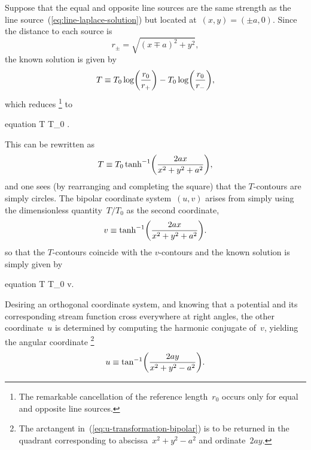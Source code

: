 Suppose that the equal and opposite line sources
are the same strength as the line source~(\ref{eq:line-laplace-solution})
but located at~$(x, y) = (\pm a, 0)$.
Since the distance to each source is
\begin{equation}
  r_\pm = \sqrt{(x \mp a)^2 + y^2},
  \label{eq:bipolar-source-distances}
\end{equation}
the known solution is given by
\begin{equation}
  T \ideq
    T_0 \log \roundbr*{\frac{r_0}{r_+}}
      -
    T_0 \log \roundbr*{\frac{r_0}{r_-}},
  \label{eq:bipolar-laplace-solution-terms}
\end{equation}
which reduces%
\footnote{
  The remarkable cancellation of the reference length~$r_0$
  occurs only for equal and opposite line sources.
}
to
\begin{important}{equation}
  T \ideq T_0 \log {}.
  \label{eq:bipolar-laplace-solution-source-distances}
\end{important}
This can be rewritten as
\begin{equation}
  T \ideq T_0 \tanh^{-1} \roundbr*{\frac{2 a x}{x^2 + y^2 + a^2}},
  \label{eq:bipolar-laplace-solution-inverse-tanh}
\end{equation}
and one sees
(by rearranging and completing the square)
that the $T$-contours are simply circles.
The bipolar coordinate system~$(u, v)$ arises
from simply using the dimensionless quantity~$T / T_0$
as the second coordinate,
\begin{equation}
  v \ideq \tanh^{-1} \roundbr*{\frac{2 a x}{x^2 + y^2 + a^2}}.
  \label{eq:v-transformation-bipolar}
\end{equation}
so that the $T$-contours coincide with the $v$-contours
and the known solution is simply given by
\begin{important}{equation}
  T \ideq T_0 \cdot v.
  \label{eq:bipolar-laplace-solution}
\end{important}
Desiring an orthogonal coordinate system,
and knowing that a potential and its corresponding stream function
cross everywhere at right angles,
the other coordinate~$u$ is determined by computing
the harmonic conjugate of~$v$,
yielding the angular coordinate%
\footnote{
  The arctangent in~(\ref{eq:u-transformation-bipolar})
  is to be returned in the quadrant corresponding to
  abscissa~$x^2 + y^2 - a^2$ and ordinate~$2 a y$.
}
\begin{equation}
  u \ideq \tan^{-1} \roundbr*{\frac{2 a y}{x^2 + y^2 - a^2}}.
  \label{eq:u-transformation-bipolar}
\end{equation}

